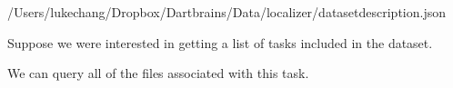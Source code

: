 \documentclass[letterpaper,10pt,english]{sphinxmanual}
\begin{document}
\begin{sphinxVerbatim}[commandchars=\\\{\}]
\end{sphinxVerbatim}

\begin{sphinxVerbatim}[commandchars=\\\{\}]
\PYGZsq{}/Users/lukechang/Dropbox/Dartbrains/Data/localizer/dataset\PYGZus{}description.json\PYGZsq{}
\end{sphinxVerbatim}

Suppose we were interested in getting a list of tasks included in the dataset.

\begin{sphinxVerbatim}[commandchars=\\\{\}]
\end{sphinxVerbatim}

\begin{sphinxVerbatim}
\end{sphinxVerbatim}

We can query all of the files associated with this task.

\begin{sphinxVerbatim}[commandchars=\\\{\}]
  \PYG{p}{[}\PYG{p}{]}
\end{sphinxVerbatim}
\end{document}
